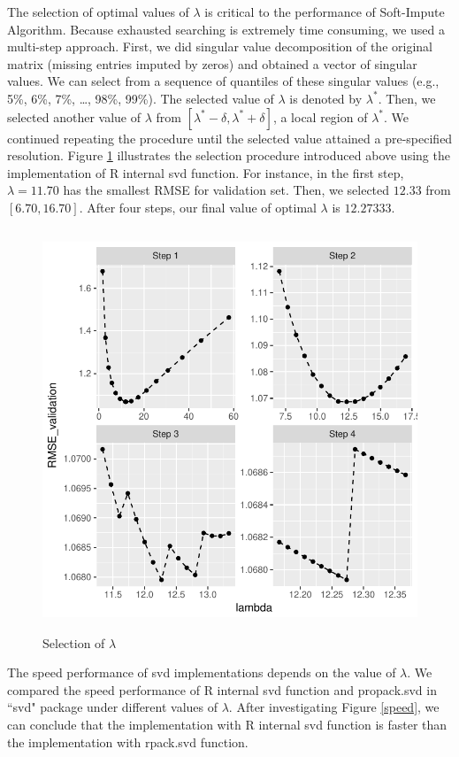 \documentclass[12pt]{article}
\begin{document}
The selection of optimal values of $\lambda$ is critical to the performance of Soft-Impute Algorithm. Because exhausted searching is extremely time consuming, we used a multi-step approach. First, we did singular value decomposition of the original matrix (missing entries imputed by zeros) and obtained a vector of singular values. We can select from a sequence of quantiles of these singular values (e.g., 5\%, 6\%, 7\%, \ldots, 98\%, 99\%). The selected value of $\lambda$ is denoted by $\lambda^{*}$. Then, we selected another value of $\lambda$ from $[\lambda^{*}-\delta, \lambda^{*}+\delta]$, a local region of $\lambda^{*}$. We continued repeating the procedure until the selected value attained a pre-specified resolution. Figure \ref{lambda} illustrates the selection procedure introduced above using the implementation of R internal svd function. For instance, in the first step, $\lambda = 11.70$ has the smallest RMSE for validation set. Then, we selected $12.33$ from $[6.70, 16.70]$. After four steps, our final value of optimal $\lambda$ is $12.27333$.

\begin{figure}[ht]
	\includegraphics[width=16cm,height=12cm]{movie}
	\caption{Selection of $\lambda$}\label{lambda}
\end{figure}

The speed performance of svd implementations depends on the value of $\lambda$. We compared the speed performance of R internal svd function and propack.svd in ``svd" package under different values of $\lambda$. After investigating Figure \ref{speed}, we can conclude that the implementation with R internal svd function is faster than the implementation with rpack.svd function.
\end{document}
